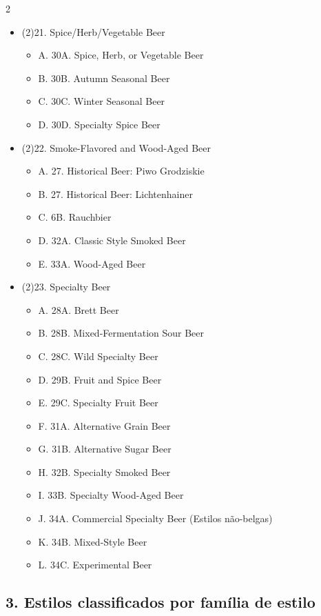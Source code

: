 \begin{multicols*}{2}
\begin{itemize}[noitemsep]
\begin{itemize}
\end{itemize}
\item[] (2)21. Spice/Herb/Vegetable Beer
\begin{itemize}
  \item[] A. 30A. Spice, Herb, or Vegetable Beer
  \item[] B. 30B. Autumn Seasonal Beer
  \item[] C. 30C. Winter Seasonal Beer
  \item[] D. 30D. Specialty Spice Beer
\end{itemize}
\item[] (2)22. Smoke-Flavored and Wood-Aged Beer
\begin{itemize}
  \item[] A. 27. Historical Beer: Piwo Grodziskie
  \item[] B. 27. Historical Beer: Lichtenhainer
  \item[] C. 6B. Rauchbier
  \item[] D. 32A. Classic Style Smoked Beer
  \item[] E. 33A. Wood-Aged Beer
\end{itemize}
\item[] (2)23. Specialty Beer
\begin{itemize}
  \item[] A. 28A. Brett Beer
  \item[] B. 28B. Mixed-Fermentation Sour Beer
  \item[] C. 28C. Wild Specialty Beer
  \item[] D. 29B. Fruit and Spice Beer
  \item[] E. 29C. Specialty Fruit Beer
  \item[] F. 31A. Alternative Grain Beer
  \item[] G. 31B. Alternative Sugar Beer
  \item[] H. 32B. Specialty Smoked Beer
  \item[] I. 33B. Specialty Wood-Aged Beer
  \item[] J. 34A. Commercial Specialty Beer (Estilos não-belgas)
  \item[] K. 34B. Mixed-Style Beer
  \item[] L. 34C. Experimental Beer
\end{itemize}
\end{itemize}

\subsection*{3. Estilos classificados por família de estilo}


\end{multicols*}
